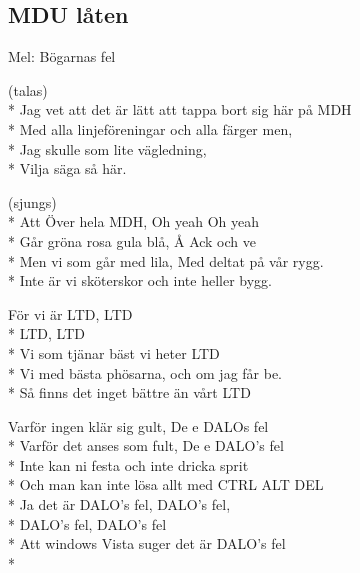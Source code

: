 

\pagestyle{Föreningssånger}

\begin{SongText}
\subsection{\textbf{MDU låten}}
\begin{SongInfo}
Mel: Bögarnas fel
\end{SongInfo}
\begin{Verse}
    (talas)\\*%
    Jag vet att det är lätt att tappa bort sig här på MDH\\*%
    Med alla linjeföreningar och alla färger men, \\*%
    Jag skulle som lite vägledning, \\*%
    Vilja säga så här.
\end{Verse}
\begin{Verse}
    (sjungs)\\*%
    Att Över hela MDH, Oh yeah Oh yeah\\*%
    Går gröna rosa gula blå, Å Ack och ve\\*%
    Men vi som går med lila, Med deltat på vår rygg.\\*%
    Inte är vi sköterskor och inte heller bygg.
\end{Verse}
\begin{Verse}
    För vi är LTD, LTD\\*%
    LTD, LTD\\*%
    Vi som tjänar bäst vi heter LTD\\*%
    Vi med bästa phösarna, och om jag får be.\\*%
    Så finns det inget bättre än vårt LTD
\end{Verse}
\begin{Verse}
    Varför ingen klär sig gult, De e DALOs fel\\*%
    Varför det anses som fult, De e DALO's fel\\*%
    Inte kan ni festa och inte dricka sprit\\*%
    Och man kan inte lösa allt med CTRL ALT DEL\\*%
    Ja det är DALO's fel, DALO's fel, \\*%
    DALO's fel, DALO's fel\\*%
    Att windows Vista suger det är DALO's fel\\*%

\end{Verse}
\end{SongText}
